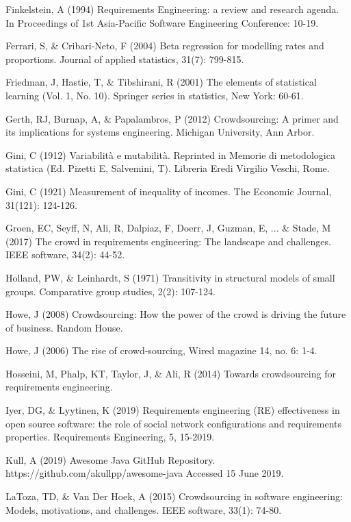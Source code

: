\begin{thebibliography}{}
Finkelstein, A (1994) Requirements Engineering: a review and research agenda. In Proceedings of 1st Asia-Pacific Software Engineering Conference: 10-19.

Ferrari, S, \& Cribari-Neto, F (2004) Beta regression for modelling rates and proportions. Journal of applied statistics, 31(7): 799-815.

Friedman, J, Hastie, T, \& Tibshirani, R (2001) The elements of statistical learning (Vol. 1, No. 10). Springer series in statistics, New York: 60-61.

Gerth, RJ, Burnap, A, \& Papalambros, P (2012) Crowdsourcing: A primer and its implications for systems engineering. Michigan University, Ann Arbor.

Gini, C (1912) Variabilità e mutabilità. Reprinted in Memorie di metodologica statistica (Ed. Pizetti E, Salvemini, T). Libreria Eredi Virgilio Veschi, Rome.

Gini, C (1921) Measurement of inequality of incomes. The Economic Journal, 31(121): 124-126.

Groen, EC, Seyff, N, Ali, R, Dalpiaz, F, Doerr, J, Guzman, E, ... \& Stade, M (2017) The crowd in requirements engineering: The landscape and challenges. IEEE software, 34(2): 44-52.

Holland, PW, \& Leinhardt, S (1971) Transitivity in structural models of small groups. Comparative group studies, 2(2): 107-124.

Howe, J (2008) Crowdsourcing: How the power of the crowd is driving the future of business. Random House.

Howe, J (2006) The rise of crowd-sourcing, Wired magazine 14, no. 6: 1-4.

Hosseini, M, Phalp, KT, Taylor, J, \& Ali, R (2014) Towards crowdsourcing for requirements engineering.

Iyer, DG, \& Lyytinen, K (2019) Requirements engineering (RE) effectiveness in open source software: the role of social network configurations and requirements properties. Requirements Engineering, 5, 15-2019.

Kull, A (2019) Awesome Java GitHub Repository. https://github.com/akullpp/awesome-java Accessed 15 June 2019.

LaToza, TD, \& Van Der Hoek, A (2015) Crowdsourcing in software engineering: Models, motivations, and challenges. IEEE software, 33(1): 74-80.


\end{thebibliography}

